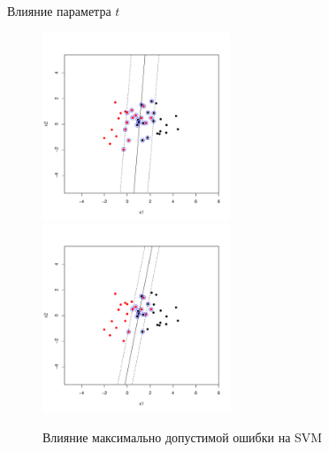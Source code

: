 \begin{frame}{Влияние параметра $t$}
	\begin{figure}
		\includegraphics[width=0.5\textwidth]{plot1em2.pdf}%
		\includegraphics[width=0.5\textwidth]{plot1ep2.pdf}
		\caption{Влияние максимально допустимой ошибки на SVM}
	\end{figure}
\end{frame}

